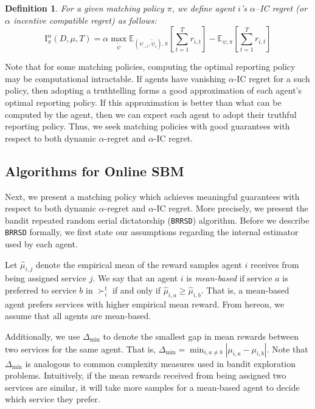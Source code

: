 \documentclass[letterpaper,11pt]{article}
\newtheorem{defn}{Definition}
\begin{document}
\begin{defn}
    For a given matching policy $\pi$, we define agent $i$'s $\alpha$--IC regret (or $\alpha$ incentive compatible regret) as follows:
    \begin{equation*}
        \text{I}^{\alpha}_{\pi}(D, \mu, T) = \alpha \max_{\tilde{\psi}} \mathbb{E}_{\left(\psi_{-i}, \tilde{\psi}_{i}\right), \pi}\left[\sum^{T}_{t=1}r_{i, t}\right] -  \mathbb{E}_{\psi, \pi}\left[\sum^{T}_{t=1}r_{i, t}\right]
    \end{equation*}
\end{defn}
Note that for some matching policies, computing the optimal reporting policy may be computational intractable. If agents have vanishing $\alpha$-IC regret for a such  policy, then adopting a truthtelling  forms a good approximation of each agent's optimal reporting policy. If this approximation is better than what can be computed by the agent, then we can expect each agent to adopt their truthful reporting policy. Thus, we seek matching policies with good guarantees with respect to both dynamic $\alpha$-regret and $\alpha$-IC regret.

\subsection{Algorithms for Online SBM}
Next, we present a matching policy which achieves meaningful guarantees with respect to both dynamic $\alpha$-regret and $\alpha$-IC regret. More precisely, we present the bandit repeated random serial dictatorship (\texttt{BRRSD}) algorithm. Before we describe \texttt{BRRSD} formally, we first state our assumptions regarding the internal estimator used by each agent. 

Let $\hat{\mu}_{i, j}$ denote the empirical mean of the reward samples agent $i$ receives from being assigned service $j$. We say that an agent $i$ is \emph{mean-based} if service $a$ is preferred to service $b$ in $\succ^{t}_{i}$ if and only if $\hat{\mu}_{i, a} \geq \hat{\mu}_{i, b}$. That is, a mean-based agent  prefers services with higher empirical mean reward. From hereon, we assume that all agents are mean-based. 

Additionally, we use $\Delta_{\text{min}}$ to denote the smallest gap in mean rewards between two services for the same agent. That is, $\Delta_{\text{min}} = \min_{i,a\neq b}\left|\mu_{i,a} - \mu_{i, b}\right|$. Note that $\Delta_\text{min}$ is analogous to common complexity measures used in bandit exploration problems. Intuitively, if the mean rewards received from being assigned two services are similar, it will take more samples for a mean-based agent to decide which service they prefer. 
\end{document}
